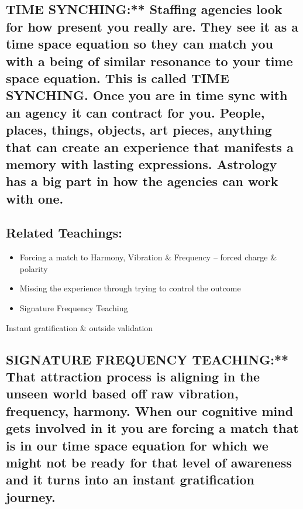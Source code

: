 \subsection{TIME SYNCHING:** Staffing agencies look for how present you
really are. They see it as a time space equation so they can match you
with a being of similar resonance to your time space equation. This is
called TIME SYNCHING. Once you are in time sync with an agency it can
contract for you. People, places, things, objects, art pieces, anything
that can create an experience that manifests a memory with lasting
expressions. Astrology has a big part in how the agencies can work with
one.}\label{time-synching-staffing-agencies-look-for-how-present-you-really-are.-they-see-it-as-a-time-space-equation-so-they-can-match-you-with-a-being-of-similar-resonance-to-your-time-space-equation.-this-is-called-time-synching.-once-you-are-in-time-sync-with-an-agency-it-can-contract-for-you.-people-places-things-objects-art-pieces-anything-that-can-create-an-experience-that-manifests-a-memory-with-lasting-expressions.-astrology-has-a-big-part-in-how-the-agencies-can-work-with-one.}

\subsection{Related Teachings:}\label{related-teachings}

\begin{itemize}
\item
  Forcing a match to Harmony, Vibration \& Frequency -- forced charge \&
  polarity
\item
  Missing the experience through trying to control the outcome
\item
  Signature Frequency Teaching
\end{itemize}

Instant gratification \& outside validation

\subsection{SIGNATURE FREQUENCY TEACHING:** That attraction process is
aligning in the unseen world based off raw vibration, frequency,
harmony. When our cognitive mind gets involved in it you are forcing a
match that is in our time space equation for which we might not be ready
for that level of awareness and it turns into an instant gratification
journey.}\label{signature-frequency-teaching-that-attraction-process-is-aligning-in-the-unseen-world-based-off-raw-vibration-frequency-harmony.-when-our-cognitive-mind-gets-involved-in-it-you-are-forcing-a-match-that-is-in-our-time-space-equation-for-which-we-might-not-be-ready-for-that-level-of-awareness-and-it-turns-into-an-instant-gratification-journey.}

